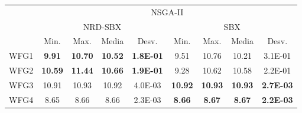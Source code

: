 \begin{table}[t]
\begin{center}
\begin{scriptsize}
\begin{tabular}{ccccccccc}
                           & \multicolumn{8}{c}{NSGA-II}                                                                                                                                                                                                                                                                                       \\ \cline{2-9} 
\multicolumn{1}{c|}{}      & \multicolumn{4}{c|}{NRD-SBX}                                                                                                                             & \multicolumn{4}{c|}{SBX}                                                                                                                                \\ \hline
\multicolumn{1}{|c|}{}     & \multicolumn{1}{c|}{Min.}            & \multicolumn{1}{c|}{Max.}            & \multicolumn{1}{c|}{Media}           & \multicolumn{1}{c|}{Desv.}               & \multicolumn{1}{c|}{Min.}            & \multicolumn{1}{c|}{Max.}            & \multicolumn{1}{c|}{Media}           & \multicolumn{1}{c|}{Desv.}               \\ \hline
\multicolumn{1}{|c|}{WFG1} & \multicolumn{1}{c|}{\textbf{9.91}}  & \multicolumn{1}{c|}{\textbf{10.70}} & \multicolumn{1}{c|}{\textbf{10.52}} & \multicolumn{1}{c|}{\textbf{1.8E-01}} & \multicolumn{1}{c|}{9.51}           & \multicolumn{1}{c|}{10.76}          & \multicolumn{1}{c|}{10.21}          & \multicolumn{1}{c|}{3.1E-01}          \\ \hline
\multicolumn{1}{|c|}{WFG2} & \multicolumn{1}{c|}{\textbf{10.59}} & \multicolumn{1}{c|}{\textbf{11.44}} & \multicolumn{1}{c|}{\textbf{10.66}} & \multicolumn{1}{c|}{\textbf{1.9E-01}} & \multicolumn{1}{c|}{9.28}           & \multicolumn{1}{c|}{10.62}          & \multicolumn{1}{c|}{10.58}          & \multicolumn{1}{c|}{2.2E-01}          \\ \hline
\multicolumn{1}{|c|}{WFG3} & \multicolumn{1}{c|}{10.91}          & \multicolumn{1}{c|}{10.93}          & \multicolumn{1}{c|}{10.92}          & \multicolumn{1}{c|}{4.0E-03}          & \multicolumn{1}{c|}{\textbf{10.92}} & \multicolumn{1}{c|}{\textbf{10.93}} & \multicolumn{1}{c|}{\textbf{10.93}} & \multicolumn{1}{c|}{\textbf{2.7E-03}} \\ \hline
\multicolumn{1}{|c|}{WFG4} & \multicolumn{1}{c|}{8.65}           & \multicolumn{1}{c|}{8.66}           & \multicolumn{1}{c|}{8.66}           & \multicolumn{1}{c|}{2.3E-03}          & \multicolumn{1}{c|}{\textbf{8.66}}  & \multicolumn{1}{c|}{\textbf{8.67}}  & \multicolumn{1}{c|}{\textbf{8.67}}  & \multicolumn{1}{c|}{\textbf{2.2E-03}} \\ \hline

\end{tabular}
\end{scriptsize}
\end{center}
\end{table}
